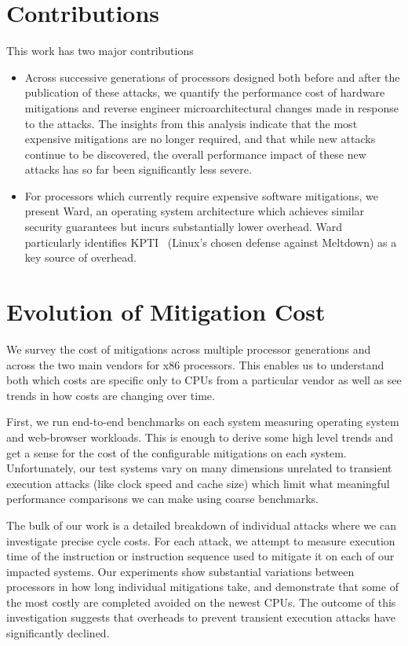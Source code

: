 \section*{Contributions}
This work has two major contributions
\begin{itemize}
\item Across successive generations of processors designed both before and after the publication of these attacks, we quantify the performance cost of hardware mitigations and reverse engineer microarchitectural changes made in response to the attacks. The insights from this analysis indicate that the most expensive mitigations are no longer required, and that while new attacks continue to be discovered, the overall performance impact of these new attacks has so far been significantly less severe.

\item For processors which currently require expensive software mitigations, we present Ward, an operating system architecture which achieves similar security guarantees but incurs substantially lower overhead. Ward particularly identifies KPTI~\cite{linux:kpti} (Linux's chosen defense against Meltdown) as a key source of overhead.
\end{itemize}

\section*{Evolution of Mitigation Cost}
We survey the cost of mitigations across multiple processor generations and across the two main vendors for x86 processors.
This enables us to understand both which costs are specific only to CPUs from a particular vendor as well as see trends in how costs are changing over time.

First, we run end-to-end benchmarks on each system measuring operating system and web-browser workloads.
This is enough to derive some high level trends and get a sense for the cost of the configurable mitigations on each system.
Unfortunately, our test systems vary on many dimensions unrelated to transient execution attacks (like clock speed and cache size) which limit what meaningful performance comparisons we can make using coarse benchmarks.

The bulk of our work is a detailed breakdown of individual attacks where we can investigate precise cycle costs.
For each attack, we attempt to measure execution time of the instruction or instruction sequence used to mitigate it on each of our impacted systems.
Our experiments show substantial variations between processors in how long individual mitigations take, and demonstrate that some of the most costly are completed avoided on the newest CPUs. 
The outcome of this investigation suggests that overheads to prevent transient execution attacks have significantly declined.

